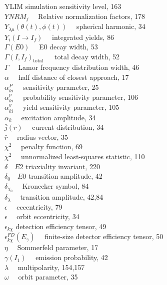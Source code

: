 \documentclass[10pt]{article}
\begin{document}
YLIM simulation sensitivity level, 163\\
$Y N R M_{j} \quad$ Relative normalization factors, 178\\
$Y_{\lambda \mu}(\theta(t), \phi(t)) \quad$ spherical harmonic, 34\\
$Y_{i}\left(I \rightarrow I_{f}\right) \quad$ integrated yields, 86\\
$\Gamma(E 0) \quad$ E0 decay width, 53\\
$\Gamma\left(I, I_{f}\right)_{\text {total }} \quad$ total decay width, 52\\
$\Gamma \quad$ Lamor frequency distribution width, 46\\
$\alpha \quad$ half distance of closest approach, 17\\
$\alpha_{k i}^{P} \quad$ sensitivity parameter, 25\\
$\alpha_{k i}^{p} \quad$ probability sensitivity parameter, 106\\
$\alpha_{k i}^{y} \quad$ yield sensitivity parameter, 105\\
$\alpha_{k} \quad$ excitation amplitude, 34\\
$\bar{j}(\bar{r}) \quad$ current distribution, 34\\
$\bar{r} \quad$ radius vector, 35\\
$\chi^{2} \quad$ penalty function, 69\\
$\chi^{2} \quad$ unnormalized least-squares statistic, 110\\
$\delta \quad E 2$ triaxiality invariant, 220\\
$\delta_{0} \quad E 0$ transition amplitude, 42\\
$\delta_{\chi_{0}} \quad$ Kronecker symbol, 84\\
$\delta_{\lambda} \quad$ transition amplitude, 42,84\\
$\epsilon \quad$ eccentricity, 79\\
$\epsilon \quad$ orbit eccentricity, 34\\
$\epsilon_{k \chi}$ detection efficiency tensor, 49\\
$\epsilon_{k \chi}^{F D}\left(E_{\gamma}\right) \quad$ finite-size detector efficiency tensor, 50\\
$\eta \quad$ Sommerfeld parameter, 17\\
$\gamma\left(I_{1}\right) \quad$ emission probability, 42\\
$\lambda \quad$ multipolarity, 154,157\\
$\omega \quad$ orbit parameter, 35\\
\end{document}
